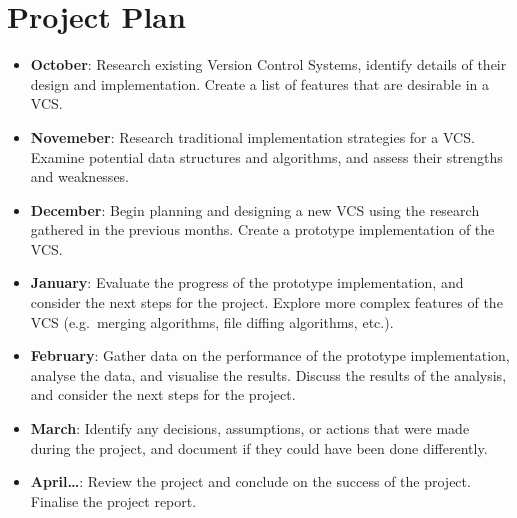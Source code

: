 \documentclass[a4paper,12pt]{article}
\begin{document}
\section*{Project Plan}
\begin{itemize}
    \item \textbf{October}: Research existing Version Control Systems, identify details of their design and implementation. Create a list of features that are desirable in a VCS\@.
    \item \textbf{Novemeber}: Research traditional implementation strategies for a VCS\@. Examine potential data structures and algorithms, and assess their strengths and weaknesses.
    \item \textbf{December}: Begin planning and designing a new VCS using the research gathered in the previous months. Create a prototype implementation of the VCS\@.
    \item \textbf{January}: Evaluate the progress of the prototype implementation, and consider the next steps for the project. Explore more complex features of the VCS (e.g.\ merging algorithms, file diffing algorithms, etc.).
    \item \textbf{February}: Gather data on the performance of the prototype implementation, analyse the data, and visualise the results. Discuss the results of the analysis, and consider the next steps for the project.
    \item \textbf{March}: Identify any decisions, assumptions, or actions that were made during the project, and document if they could have been done differently.
    \item \textbf{April\ldots}: Review the project and conclude on the success of the project. Finalise the project report.
\end{itemize}



\end{document}
